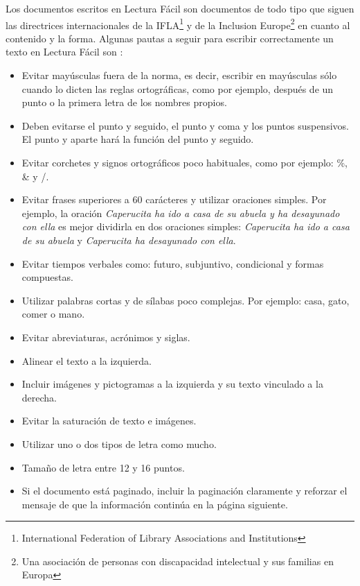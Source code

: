 	
	
Los documentos escritos en Lectura Fácil \citep{wiki:lecturafacil} son documentos de todo tipo que siguen las directrices internacionales de la IFLA\footnote{International Federation of Library Associations and Institutions} y de la Inclusion Europe\footnote{Una asociación de personas con discapacidad intelectual y sus familias en Europa} en cuanto al contenido y la forma.
Algunas pautas a seguir para escribir correctamente un texto en Lectura Fácil son \citep{GarciaMunoz2012LecturaFacil}:


\begin{itemize}
	\item Evitar mayúsculas fuera de la norma, es decir, escribir en mayúsculas sólo cuando lo dicten las reglas ortográficas, como por ejemplo, después de un punto o la primera letra de los nombres propios.
	\item Deben evitarse el punto y seguido, el punto y coma y los puntos suspensivos. El punto y aparte hará la función del punto y seguido.
	\item Evitar corchetes y signos ortográficos poco habituales, como por ejemplo: \%, \& y /.
	\item Evitar frases superiores a 60 carácteres y utilizar oraciones simples. Por ejemplo, la oración \textit{Caperucita ha ido a casa de su abuela y ha desayunado con ella} es mejor dividirla en dos oraciones simples:\textit{ Caperucita ha ido a casa de su abuela} y  \textit{Caperucita ha desayunado con ella}.
	\item Evitar tiempos verbales como: futuro, subjuntivo, condicional y formas compuestas.
	\item Utilizar palabras cortas y de sílabas poco complejas. 
	Por ejemplo: casa, gato, comer o mano.
	\item Evitar abreviaturas, acrónimos y siglas.
	\item Alinear el texto a la izquierda.
	\item Incluir imágenes y pictogramas a la izquierda y su texto vinculado a la derecha.
	\item Evitar la saturación de texto e imágenes.
	\item Utilizar uno o dos tipos de letra como mucho.
	\item Tamaño de letra entre 12 y 16 puntos.
	\item Si el documento está paginado, incluir la paginación claramente y reforzar el mensaje de que la información continúa en la página siguiente.
\end{itemize}

